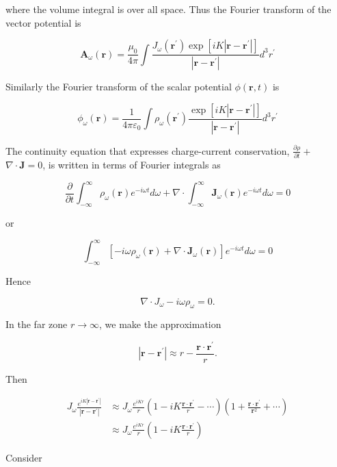 \documentclass[10pt]{article}
\begin{document}
where the volume integral is over all space. Thus the Fourier transform of the vector potential is

$$
\mathbf{A}_{\omega}(\mathbf{r})=\frac{\mu_{0}}{4 \pi} \int \frac{J_{\omega}\left(\mathbf{r}^{\prime}\right) \exp \left[i K\left|\mathbf{r}-\mathbf{r}^{\prime}\right|\right]}{\left|\mathbf{r}-\mathbf{r}^{\prime}\right|} d^{3} r^{\prime}
$$

Similarly the Fourier transform of the scalar potential $\phi(\mathbf{r}, t)$ is

$$
\phi_{\omega}(\mathbf{r})=\frac{1}{4 \pi \varepsilon_{0}} \int \rho_{\omega}\left(\mathbf{r}^{\prime}\right) \frac{\exp \left[i K\left|\mathbf{r}-\mathbf{r}^{\prime}\right|\right]}{\left|\mathbf{r}-\mathbf{r}^{\prime}\right|} d^{3} r^{\prime}
$$

The continuity equation that expresses charge-current conservation, $\frac{\partial \rho}{\partial t}+$ $\nabla \cdot \mathbf{J}=0$, is written in terms of Fourier integrals as

$$
\frac{\partial}{\partial t} \int_{-\infty}^{\infty} \rho_{\omega}(\mathbf{r}) e^{-i \omega t} d \omega+\nabla \cdot \int_{-\infty}^{\infty} \mathbf{J}_{\omega}(\mathbf{r}) e^{-i \omega t} d \omega=0
$$

or

$$
\int_{-\infty}^{\infty}\left[-i \omega \rho_{\omega}(\mathbf{r})+\nabla \cdot \mathbf{J}_{\omega}(\mathbf{r})\right] e^{-i \omega t} d \omega=0
$$

Hence

$$
\nabla \cdot J_{\omega}-i \omega \rho_{\omega}=0 .
$$

In the far zone $r \rightarrow \infty$, we make the approximation

$$
\left|\mathbf{r}-\mathbf{r}^{\prime}\right| \approx r-\frac{\mathbf{r} \cdot \mathbf{r}^{\prime}}{r} .
$$

Then

$$
\begin{aligned}
J_{\omega} \frac{e^{i K\left|\mathbf{r}-\mathbf{r}^{\prime}\right|}}{\left|\mathbf{r}-\mathbf{r}^{\prime}\right|} & \approx J_{\omega} \frac{e^{i K r}}{r}\left(1-i K \frac{\mathbf{r} \cdot \mathbf{r}^{\prime}}{r}-\cdots\right)\left(1+\frac{\mathbf{r} \cdot \mathbf{r}^{\prime}}{\mathbf{r}^{2}}+\cdots\right) \\
& \approx J_{\omega} \frac{e^{i K r}}{r}\left(1-i K \frac{\mathbf{r} \cdot \mathbf{r}^{\prime}}{r}\right)
\end{aligned}
$$

Consider
\end{document}
